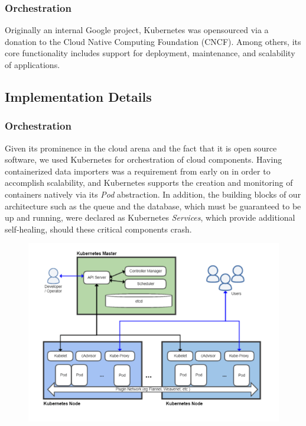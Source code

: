 \subsubsection{Orchestration}\label{orchestration}

Originally an internal Google project, Kubernetes was opensourced via a
donation to the Cloud Native Computing Foundation (CNCF). Among others,
its core functionality includes support for deployment, maintenance, and
scalability of applications.

\subsection{Implementation Details}\label{implementation-details}

\subsubsection{Orchestration}\label{orchestration-1}

Given its prominence in the cloud arena and the fact that it is open
source software, we used Kubernetes for orchestration of cloud
components. Having containerized data importers was a requirement from
early on in order to accomplish scalability, and Kubernetes supports the
creation and monitoring of containers natively via its \emph{Pod}
abstraction. In addition, the building blocks of our architecture such
as the queue and the database, which must be guaranteed to be up and
running, were declared as Kubernetes \emph{Services}, which provide
additional self-healing, should these critical components crash.

\begin{figure}[htbp]
\centering
\includegraphics[width=1.00\textwidth]{images/Kubernetes.png}
\caption{}
\end{figure}

